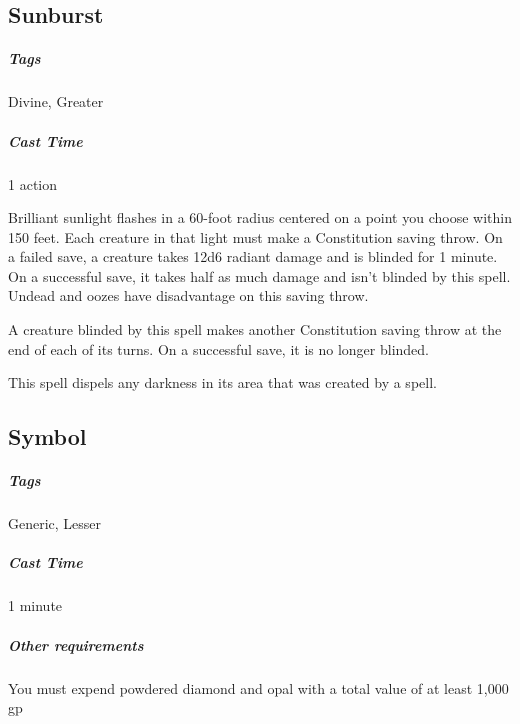 



\subsection{Sunburst\label{spell:sunburst}}
\subparagraph*{Tags} Divine, Greater
\subparagraph*{Cast Time} 1 action

Brilliant sunlight flashes in a 60-foot radius centered on a point you choose within 150 feet. Each creature in that light must make a Constitution saving throw. On a failed save, a creature takes 12d6 radiant damage and is blinded for 1 minute. On a successful save, it takes half as much damage and isn’t blinded by this spell. Undead and oozes have disadvantage on this saving throw.

A creature blinded by this spell makes another Constitution saving throw at the end of each of its turns. On a successful save, it is no longer blinded.

This spell dispels any darkness in its area that was created by a spell.

\subsection{Symbol\label{spell:symbol}}
\subparagraph*{Tags} Generic, Lesser
\subparagraph*{Cast Time} 1 minute
\subparagraph*{Other requirements} You must expend powdered diamond and opal with a total value of at least 1,000 gp

